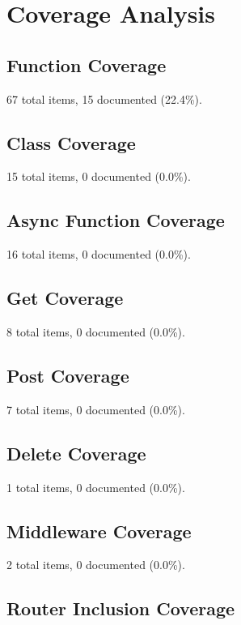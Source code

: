 \documentclass[11pt,a4paper]{article}
\begin{document}
\section{Coverage Analysis}

\subsection{Function Coverage}

67 total items, 15 documented (22.4\%).

\subsection{Class Coverage}

15 total items, 0 documented (0.0\%).

\subsection{Async Function Coverage}

16 total items, 0 documented (0.0\%).

\subsection{Get Coverage}

8 total items, 0 documented (0.0\%).

\subsection{Post Coverage}

7 total items, 0 documented (0.0\%).

\subsection{Delete Coverage}

1 total items, 0 documented (0.0\%).

\subsection{Middleware Coverage}

2 total items, 0 documented (0.0\%).

\subsection{Router Inclusion Coverage}
\end{document}
